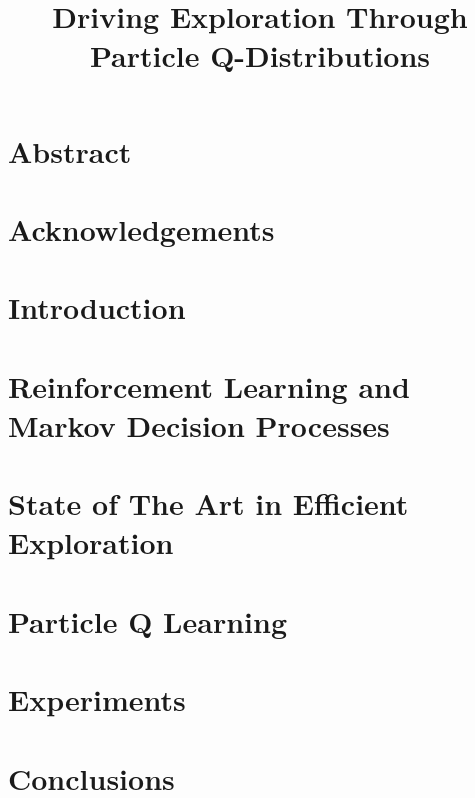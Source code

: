 \documentclass[11pt]{report}
\begin{document}
\title{
	Driving Exploration Through Particle Q-Distributions
}
%

\chapter*{Abstract}


\chapter*{Acknowledgements}


\tableofcontents

\listoffigures

\listoftables

\listofalgorithms

\chapter{Introduction}

\chapter{Reinforcement Learning and Markov Decision Processes} \label{chap:chapter2}
 
\chapter{State of The Art in Efficient Exploration} \label{chap:chapter3}
 
\chapter{Particle Q Learning} \label{chap:chapter4}
 
\chapter{Experiments}		\label{chap:chapter5}
 
\chapter{Conclusions}		\label{chap:chapter6}
 


\end{document}
